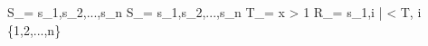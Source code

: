 S_\alpha = {s_1,s_2,...,s_n} \newline
S_\beta = {s_1,s_2,...,s_n} \newline
T_\theta = x > 1 \newline
R_\theta = {s_1,i |  < T, \forall i \in \{1,2,...,n\}}